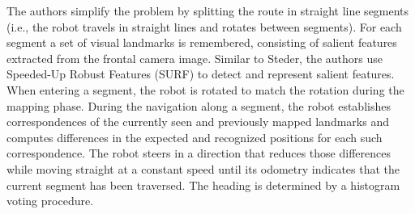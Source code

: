 The authors simplify the problem by splitting the route in straight line segments (i.e., the robot travels in straight lines and rotates between segments).
For each segment a set of visual landmarks is remembered, consisting of salient features extracted from the frontal camera image.
Similar to Steder, the authors use Speeded-Up Robust Features (SURF) to detect and represent salient features.
When entering a segment, the robot is rotated to match the rotation during the mapping phase.
During the navigation along a segment, the robot establishes correspondences of the currently seen and previously mapped landmarks and computes differences in the expected and recognized positions for each such correspondence.
The robot steers in a direction that reduces those differences while moving straight at a constant speed until its odometry indicates that the current segment has been traversed.
The heading is determined by a histogram voting procedure.
